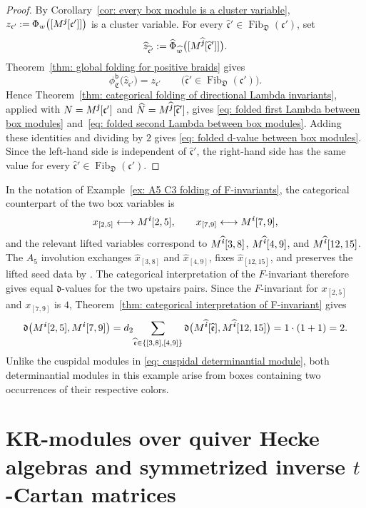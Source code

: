\documentclass[12pt, leqno]{amsart}
\numberwithin{equation}{section}
\theoremstyle{plain}
\theoremstyle{definition}
\newcommand{\seteq}{\mathbin{:=}}
\newcommand{\de}{\mathfrak{d}}
\newcommand{\ii}{ \textbf{\textit{i}}}
\newcommand{\jj}{ \textbf{\textit{j}}}
\newcommand{\Fib}{\operatorname{Fib}}
\newcommand{\hN}{\widehat{N}}
\newcommand{\hw}{\widehat{w}}
\newcommand{\hx}{\widehat{x}}
\newcommand{\hz}{\widehat{z}}
\newcommand{\hii}{{\widehat{\ii}}}
\newcommand{\hjj}{{\widehat{\jj}}}
\newcommand{\frakC}{\mathfrak{C}}
\newcommand{\frakD}{\mathfrak{D}}
\newcommand{\frakc}{\mathfrak{c}}
\newcommand{\frake}{\mathfrak{e}}
\newcommand{\hfrakc}{\widehat{\frakc}}
\newcommand{\hfrake}{\widehat{\frake}}
\newcommand{\ttb}{\mathtt{b}}
\begin{document}
\begin{proof}
By Corollary~\ref{cor: every box module is a cluster variable},
$z_{\frakc'} \seteq \Phi_w\bigl([M^\jj[\frakc']]\bigr)$
is a cluster variable.  For every
\(\hfrakc'\in\Fib_{\frakD}(\frakc')\), set
\[
\hz_{\hfrakc'} \seteq \widehat\Phi_{\hw} \bigl([M^\hjj[\hfrakc']]\bigr).
\]
Theorem~\ref{thm: global folding for positive braids} gives
\[
\phi_{\frakC}^{\ttb} \bigl(\hz_{\hfrakc'}\bigr)
= z_{\frakc'}
\qquad
\bigl(\hfrakc'\in\Fib_{\frakD}(\frakc')\bigr).
\]
Hence Theorem~\ref{thm: categorical folding of directional Lambda invariants},
applied with \(N=M^\jj[\frakc']\) and
\(\hN=M^\hjj[\hfrakc']\), gives
\eqref{eq: folded first Lambda between box modules}
and~\eqref{eq: folded second Lambda between box modules}.
Adding these identities and dividing by $2$ gives
\eqref{eq: folded d-value between box modules}.
Since the left-hand side is independent of
\(\hfrakc'\), the right-hand side has the same value for every
\(\hfrakc'\in\Fib_{\frakD}(\frakc')\).
\end{proof}


In the notation of
Example~\ref{ex: A5 C3 folding of F-invariants}, the categorical
counterpart of the two box variables is
\[
x_{[2,5]}\longleftrightarrow M^\ii[2,5],
\qquad
x_{[7,9]}\longleftrightarrow M^\ii[7,9],
\]
and the relevant lifted variables correspond to
\(M^\hii[3,8]\), \(M^\hii[4,9]\), and \(M^\hii[12,15]\).
The \(A_5\) involution exchanges \(\hx_{[3,8]}\) and
\(\hx_{[4,9]}\), fixes \(\hx_{[12,15]}\), and preserves the lifted
seed data by \cite[Lemma~3.14]{JO26}.
The categorical interpretation of the \(F\)-invariant therefore
gives equal \(\de\)-values for the two upstairs pairs.
Since the \(F\)-invariant for \(x_{[2,5]}\) and \(x_{[7,9]}\)
is \(4\), Theorem~\ref{thm: categorical interpretation of F-invariant}
gives 
\[
\de\bigl(M^\ii[2,5],M^\ii[7,9]\bigr)
=d_2\!\sum_{\hfrake\in\{[3,8],[4,9]\}}
\de\bigl(M^\hii[\hfrake],M^\hii[12,15]\bigr)\\
=1\cdot(1+1)=2.
\]
Unlike the cuspidal modules in
\eqref{eq: cuspidal determinantial module}, both determinantial
modules in this example arise from boxes containing two occurrences
of their respective colors.   

\section{KR-modules over quiver Hecke algebras and symmetrized inverse
\texorpdfstring{\(t\)}{t}-Cartan matrices}
\label{sec: KR modules and inverse}
\end{document}

